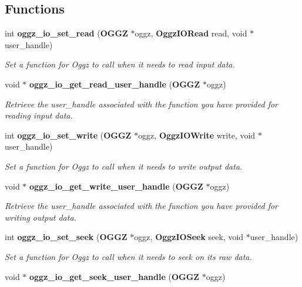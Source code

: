 \subsection*{Functions}
\begin{CompactItemize}
\item 
int {\bf oggz\_\-io\_\-set\_\-read} ({\bf OGGZ} $\ast$oggz, {\bf Oggz\-IORead} read, void $\ast$user\_\-handle)
\begin{CompactList}\small\item\em Set a function for Oggz to call when it needs to read input data. \item\end{CompactList}\item 
void $\ast$ {\bf oggz\_\-io\_\-get\_\-read\_\-user\_\-handle} ({\bf OGGZ} $\ast$oggz)
\begin{CompactList}\small\item\em Retrieve the user\_\-handle associated with the function you have provided for reading input data. \item\end{CompactList}\item 
int {\bf oggz\_\-io\_\-set\_\-write} ({\bf OGGZ} $\ast$oggz, {\bf Oggz\-IOWrite} write, void $\ast$user\_\-handle)
\begin{CompactList}\small\item\em Set a function for Oggz to call when it needs to write output data. \item\end{CompactList}\item 
void $\ast$ {\bf oggz\_\-io\_\-get\_\-write\_\-user\_\-handle} ({\bf OGGZ} $\ast$oggz)
\begin{CompactList}\small\item\em Retrieve the user\_\-handle associated with the function you have provided for writing output data. \item\end{CompactList}\item 
int {\bf oggz\_\-io\_\-set\_\-seek} ({\bf OGGZ} $\ast$oggz, {\bf Oggz\-IOSeek} seek, void $\ast$user\_\-handle)
\begin{CompactList}\small\item\em Set a function for Oggz to call when it needs to seek on its raw data. \item\end{CompactList}\item 
void $\ast$ {\bf oggz\_\-io\_\-get\_\-seek\_\-user\_\-handle} ({\bf OGGZ} $\ast$oggz)

\end{CompactItemize}
